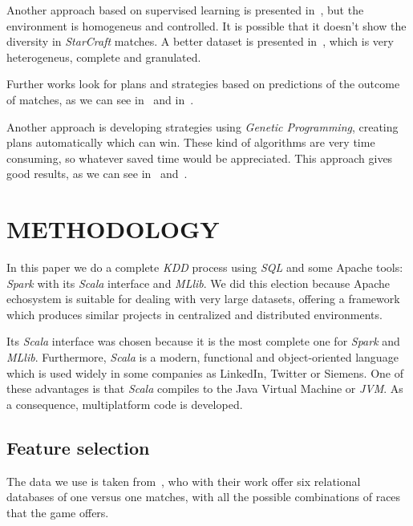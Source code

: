 \documentclass[a4paper,twoside]{article}\usepackage[]{graphicx}\usepackage[]{color}
\begin{document}
Another approach based on supervised learning is presented
in~\cite{DBLP:conf/cosecivi/Sanchez-Ruiz15}, but the environment is homogeneus
and controlled. It is possible that it doesn't show the diversity in
\emph{StarCraft} matches. A better dataset is presented
in~\cite{DBLP:conf/flairs/RobertsonW14}, which is very heterogeneus,
complete and granulated.

Further works look for plans and strategies based on predictions of the outcome
of matches, as we can see in~\cite{adaptativeStrategyPrediction} and
in~\cite{makingAndActing}.

Another approach is developing strategies using \emph{Genetic Programming},
creating plans automatically which can win. These kind of algorithms are very
time consuming, so whatever saved time would be appreciated. This approach
gives good results, as we can see in~\cite{DBLP:conf/evoW/Fernandez-AresG16}
and~\cite{DBLP:conf/cig/Garcia-SanchezT15}.

\section{\uppercase{Methodology}}
\label{sec:metodology}

In this paper we do a complete \emph{KDD} process using \emph{SQL} and some
Apache tools: \emph{Spark} with its \emph{Scala} interface and \emph{MLlib}.
We did this election because Apache echosystem is suitable for dealing
with very large datasets, offering a framework which produces similar projects
in centralized and distributed environments.

Its \emph{Scala} interface was chosen because it is the most complete
one for \emph{Spark} and \emph{MLlib}. Furthermore, \emph{Scala} is a modern,
functional and object-oriented language which is used widely in some companies
as LinkedIn, Twitter or Siemens. One of these advantages is that \emph{Scala}
compiles to the Java Virtual Machine or \emph{JVM}. As a consequence,
multiplatform code is developed.

\subsection{Feature selection}
\label{subsec:selection}


The data we use is taken from~\cite{DBLP:conf/flairs/RobertsonW14}, who with
their work offer six relational databases of one versus one matches, with all
the possible combinations of races that the game offers.
\end{document}
